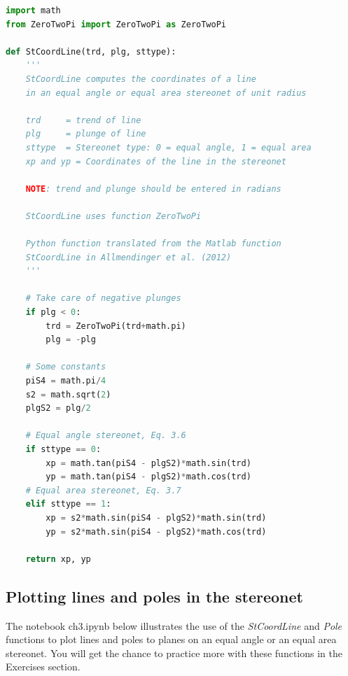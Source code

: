 \documentclass[a4paper , 12pt]{book}
\begin{document}
\begin{center}
\begin{lstlisting}[language=Python, frame=single]
import math
from ZeroTwoPi import ZeroTwoPi as ZeroTwoPi

def StCoordLine(trd, plg, sttype):
    '''
    StCoordLine computes the coordinates of a line 
    in an equal angle or equal area stereonet of unit radius
    
    trd  	= trend of line
    plg  	= plunge of line
    sttype 	= Stereonet type: 0 = equal angle, 1 = equal area
    xp and yp = Coordinates of the line in the stereonet

    NOTE: trend and plunge should be entered in radians

    StCoordLine uses function ZeroTwoPi
    
    Python function translated from the Matlab function 
    StCoordLine in Allmendinger et al. (2012)
    '''
    
    # Take care of negative plunges
    if plg < 0:
        trd = ZeroTwoPi(trd+math.pi)
        plg = -plg
        
    # Some constants
    piS4 = math.pi/4
    s2 = math.sqrt(2)
    plgS2 = plg/2
        
    # Equal angle stereonet, Eq. 3.6
    if sttype == 0:
        xp = math.tan(piS4 - plgS2)*math.sin(trd)
        yp = math.tan(piS4 - plgS2)*math.cos(trd)
    # Equal area stereonet, Eq. 3.7
    elif sttype == 1:
        xp = s2*math.sin(piS4 - plgS2)*math.sin(trd)
        yp = s2*math.sin(piS4 - plgS2)*math.cos(trd)
    
    return xp, yp
\end{lstlisting}   
\end{center}

\subsection{Plotting lines and poles in the stereonet}
The notebook ch3.ipynb below illustrates the use of the \textit{StCoordLine} and \textit{Pole} functions to plot lines and poles to planes on an equal angle or an equal area stereonet. You will get the chance to practice more with these functions in the Exercises section.
\end{document}
